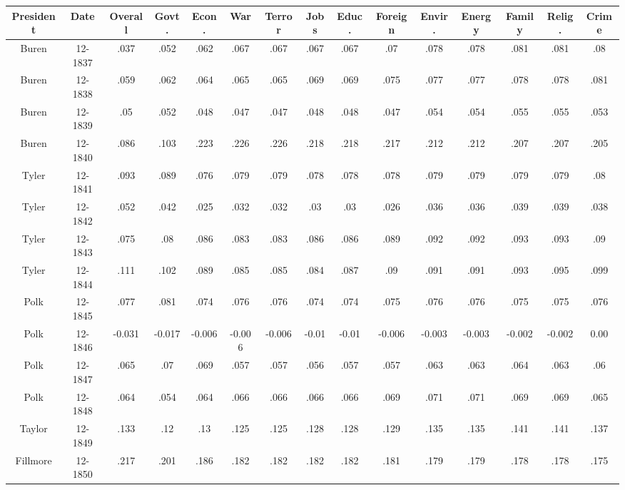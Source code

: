 \begin{sidewaystable}
\begin{singlespace}
\begin{center}
 \begin{tabular}{||c c c c c c c c c c c c c c c||}
 \hline
 President & Date & Overall & Govt. & Econ. & War & Terror & Jobs & Educ. & Foreign & Envir. & Energy & Family & Relig. & Crime \\
 \hline\hline
Buren & 12-1837 & .037 & .052 & .062 & .067 & .067 & .067 & .067 & .07 & .078 & .078 & .081 & .081 & .08 \\ 
\hline
Buren & 12-1838 & .059 & .062 & .064 & .065 & .065 & .069 & .069 & .075 & .077 & .077 & .078 & .078 & .081 \\ 
\hline
Buren & 12-1839 & .05 & .052 & .048 & .047 & .047 & .048 & .048 & .047 & .054 & .054 & .055 & .055 & .053 \\ 
\hline
Buren & 12-1840 & .086 & .103 & .223 & .226 & .226 & .218 & .218 & .217 & .212 & .212 & .207 & .207 & .205 \\ 
\hline
Tyler & 12-1841 & .093 & .089 & .076 & .079 & .079 & .078 & .078 & .078 & .079 & .079 & .079 & .079 & .08 \\ 
\hline
Tyler & 12-1842 & .052 & .042 & .025 & .032 & .032 & .03 & .03 & .026 & .036 & .036 & .039 & .039 & .038 \\ 
\hline
Tyler & 12-1843 & .075 & .08 & .086 & .083 & .083 & .086 & .086 & .089 & .092 & .092 & .093 & .093 & .09 \\ 
\hline
Tyler & 12-1844 & .111 & .102 & .089 & .085 & .085 & .084 & .087 & .09 & .091 & .091 & .093 & .095 & .099 \\ 
\hline
Polk & 12-1845 & .077 & .081 & .074 & .076 & .076 & .074 & .074 & .075 & .076 & .076 & .075 & .075 & .076 \\ 
\hline
Polk & 12-1846 & -0.031 & -0.017 & -0.006 & -0.006 & -0.006 & -0.01 & -0.01 & -0.006 & -0.003 & -0.003 & -0.002 & -0.002 & 0.00 \\ 
\hline
Polk & 12-1847 & .065 & .07 & .069 & .057 & .057 & .056 & .057 & .057 & .063 & .063 & .064 & .063 & .06 \\ 
\hline
Polk & 12-1848 & .064 & .054 & .064 & .066 & .066 & .066 & .066 & .069 & .071 & .071 & .069 & .069 & .065 \\ 
\hline
Taylor & 12-1849 & .133 & .12 & .13 & .125 & .125 & .128 & .128 & .129 & .135 & .135 & .141 & .141 & .137 \\ 
\hline
Fillmore & 12-1850 & .217 & .201 & .186 & .182 & .182 & .182 & .182 & .181 & .179 & .179 & .178 & .178 & .175 \\ 

\end{tabular}
\end{center}
\end{singlespace}
\end{sidewaystable}
